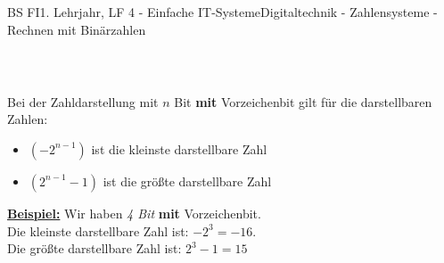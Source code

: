 \documentclass[11pt,twocolumn,oneside,openany,headings=optiontotoc,11pt,numbers=noenddot]{article}
\begin{document}
\begin{worksheet}{BS FI}{1. Lehrjahr, LF 4 - Einfache IT-Systeme}{Digitaltechnik - Zahlensysteme - Rechnen mit Binärzahlen}
\begin{tabularx}{0.48\textwidth}{c|lll||rrr|c}
		\end{tabularx}\\
		\par\noindent
		\begin{framed}
			\noindent
			Bei der Zahldarstellung mit \(n\) Bit \textbf{mit} Vorzeichenbit gilt für die darstellbaren Zahlen:
			\begin{itemize}
				\item[] \((-2^{n-1})\) ist die kleinste darstellbare Zahl
				\item[] \((2^{n-1}-1)\) ist die größte darstellbare Zahl
			\end{itemize}
		\end{framed}
		\par\noindent
		\textbf{\underline{Beispiel:}} Wir haben \textit{4 Bit} \textbf{mit} Vorzeichenbit.\\
		Die kleinste darstellbare Zahl ist: \(-2^3 = -16\).\\
		Die größte darstellbare Zahl ist: \(2^3-1 = 15\)
	\end{worksheet}
\end{document}
